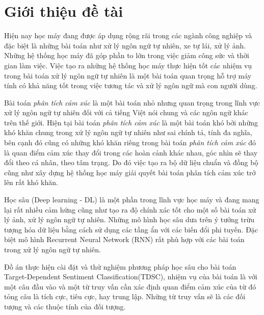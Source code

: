 \documentclass[fontsize=12pt]{scrartcl}
\begin{document}
\newpage
\listoffigures

\newpage
\listoftables
\newpage
\section{Giới thiệu đề tài}
\par
Hiện nay học máy đang được áp dụng rộng rãi trong các ngành công nghiệp và đặc biệt là những bài toán như xử lý ngôn ngữ tự nhiên, xe tự lái, xử lý ảnh. Những hệ thống học máy đã góp phần to lớn trong việc giảm công sức và thời gian làm việc. Việc tạo ra những hệ thống học máy thực hiện tốt các nhiệm vụ trong bài toán xử lý ngôn ngữ tự nhiên là một bài toán quan trọng hỗ trợ máy tính có khả năng tốt trong việc tương tác và xử lý ngôn ngữ mà con người dùng.
\par

Bài toán \textit{phân tích cảm xúc} là một bài toán nhỏ nhưng quan trọng trong lĩnh vực xử lý ngôn ngữ tự nhiên đối với cả tiếng Việt nói chung và các ngôn ngữ khác trên thế giới. Hiện tại bài toán \textit{phân tích cảm xúc} là một bài toán khó bởi những khó khăn chung trong xử lý ngôn ngữ tự nhiên như sai chính tả, tính đa nghĩa, bên cạnh đó cũng có những khó khăn riêng trong bài toán \textit{phân tích cảm xúc} đó là quan điểm cảm xúc thay đổi trong các hoàn cảnh khác nhau, góc nhìn sẽ thay đổi theo cá nhân, theo tâm trạng. Do đó việc tạo ra bộ dữ liệu chuẩn và đồng bộ cũng như xây dựng hệ thống học máy giải quyết bài toán phân tích cảm xúc trở lên rất khó khăn.
\par

Học sâu (Deep learning - DL) là một phần trong lĩnh vực học máy và đang mang lại rất nhiều cảm hứng cũng như tạo ra độ chính xác tốt cho một số bài toán xử lý ảnh, xử lý ngôn ngữ tự nhiên. Những mô hình học sâu dưa trên ý tưởng trừu tượng hóa dữ liệu bằng cách sử dụng các tầng ẩn với các biến đổi phi tuyến. Đặc biệt mô hình Recurrent Neural Network (RNN) rất phù hợp với các bài toán trong xử lý ngôn ngữ tự nhiên.

\par

Đồ án thực hiện cài đặt và thử nghiệm phương pháp học sâu cho bài toán Target-Dependent Sentiment Classification(TDSC), nhiệm vụ của bài toán là với một câu đầu vào và một từ truy vấn cần xác định quan điểm cảm xúc của từ đó tỏng câu là tích cực, tiêu cực, hay trung lập. Những từ truy vấn sẽ là các đối tượng và các thuộc tính của đối tượng.
\par 
\end{document}
